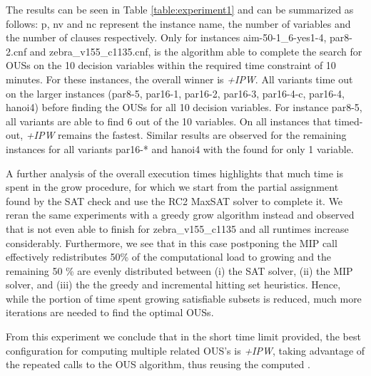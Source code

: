 {%
The results can be seen in Table \ref{table:experiment1} and can be summarized as follows: p, nv and nc represent the instance name, the number of variables and the number of clauses respectively. 
Only for instances aim-50-1\_6-yes1-4, par8-2.cnf and zebra\_v155\_c1135.cnf, is the algorithm able to complete the search for OUSs on the 10 decision variables within the required time constraint of 10 minutes.
For these instances, the overall winner is \emph{{\omus}+IPW}. 
All variants time out on the larger instances (par8-5, par16-1, par16-2, par16-3, par16-4-c, par16-4, hanoi4) before finding the OUSs for all 10 decision variables. For instance par8-5, all variants are able to find 6 out of the 10 variables. On all instances that timed-out, \emph{{\omus}+IPW} remains the fastest. Similar results are observed for the remaining instances for all variants par16-* and hanoi4 with the \omus found for only 1 variable.


A further analysis of the overall execution times highlights that much time is spent in the grow procedure, for which we start from the partial assignment found by the SAT check and use the RC2 MaxSAT solver to complete it. 
We reran the same experiments with a greedy grow algorithm instead and observed that \omus is not even able to finish for zebra\_v155\_c1135 and all runtimes increase considerably.
Furthermore, we see that in this case postponing the MIP call effectively redistributes 50\% of the computational load to growing \satsets and the remaining 50 \% are evenly distributed between (i) the SAT solver, (ii) the MIP solver, and (iii) the the greedy and incremental hitting set heuristics. Hence, while the portion of time spent growing satisfiable subsets is reduced, much more iterations are needed to find the optimal OUSs. %

From this experiment we conclude that in the short time limit provided, the best configuration for computing multiple related OUS's is \emph{{\omus}+IPW}, taking advantage of the repeated calls to the OUS algorithm, thus reusing the computed \satsets.

}
